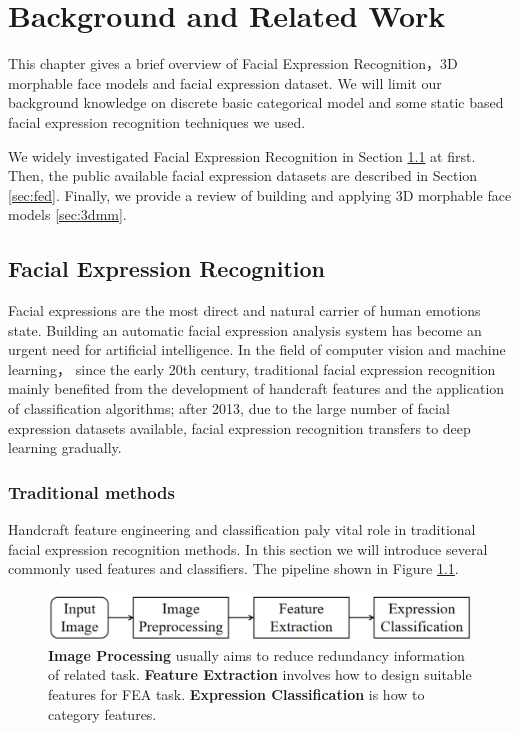 \chapter{Background and Related Work}
\label{cha:background}

This chapter gives a brief overview of Facial Expression Recognition，3D morphable face models and facial expression dataset. We will limit our background knowledge on discrete basic categorical model and some static based facial expression recognition techniques we used.

We widely investigated Facial Expression Recognition in Section \ref{sec:fer} at first. Then, the public available facial expression datasets are described in Section \ref{sec:fed}. Finally, we provide a review of building and applying 3D morphable face models \ref{sec:3dmm}.

\section{Facial Expression Recognition}
\label{sec:fer}
Facial expressions are the most direct and natural carrier of human emotions state\citep{darwinExpressionEmotionsMan2009}. Building an automatic facial expression analysis system has become an urgent need for artificial intelligence. In the field of computer vision and machine learning， since the early 20th century, traditional facial expression recognition  mainly benefited from the development of handcraft features and the application of classification algorithms; after 2013, due to the large number of facial expression datasets available, facial expression recognition transfers to deep learning gradually.

\subsection{Traditional methods}
Handcraft feature engineering and classification paly vital role in traditional facial expression recognition methods. In this section we will introduce several commonly used features and classifiers. The pipeline shown in Figure \ref{fig:traditional pipeline}.

\begin{figure}
    \centering
    \includegraphics[width=\textwidth]{./figs/symmetry-11-01189-g004.jpg}
    \caption{\textbf{Image Processing} usually aims to reduce redundancy information of related task. \textbf{Feature Extraction} involves how to design suitable features for FEA task. \textbf{Expression Classification} is how to category features.}
    \label{fig:traditional pipeline}

\end{figure}

